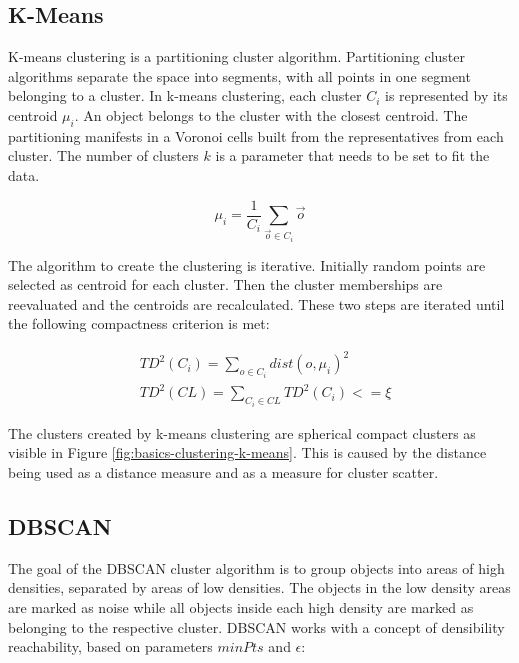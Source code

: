 \documentclass[pdftex,12pt,a4paper]{report}
\begin{document}
\subsection{K-Means}

K-means clustering is a partitioning cluster algorithm. Partitioning cluster algorithms separate the space into segments, with all points in one segment belonging to a cluster. In k-means clustering, each cluster $C_i$ is represented by its centroid $\mu_i$. An object belongs to the cluster with the closest centroid. The partitioning manifests in a Voronoi cells built from the representatives from each cluster. The number of clusters $k$ is a parameter that needs to be set to fit the data.

\begin{equation}
\mu_i = \frac{1}{C_i} \sum_{\vec{o} \in C_i}\vec{o}
\end{equation}

The algorithm to create the clustering is iterative. Initially random points are selected as centroid for each cluster. Then the cluster memberships are reevaluated and the centroids are recalculated. These two steps are iterated until the following compactness criterion is met:

\begin{equation}
\begin{split}
& TD^2(C_i) = \sum\limits_{o \in C_i} dist(o, \mu_i)^2  \\
& TD^2(CL) = \sum\limits_{C_i \in CL} TD^2(C_i) <= \xi
\end{split}
\end{equation}

The clusters created by k-means clustering are spherical compact clusters as visible in Figure \ref{fig:basics-clustering-k-means}. This is caused by the distance being used as a distance measure and as a measure for cluster scatter.

\subsection{DBSCAN}

The goal of the DBSCAN cluster algorithm is to group objects into areas of high densities, separated by areas of low densities. The objects in the low density areas are marked as noise while all objects inside each high density are marked as belonging to the respective cluster. DBSCAN works with a concept of densibility reachability, based on parameters $minPts$ and $\epsilon$:
\end{document}
